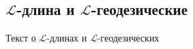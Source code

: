 \subsection{\texorpdfstring{$\mathcal{L}$-длина и $\mathcal{L}$-геодезические}{L-длина и L-геодезические}}
Текст о $\mathcal{L}$-длинах и $\mathcal{L}$-геодезических
